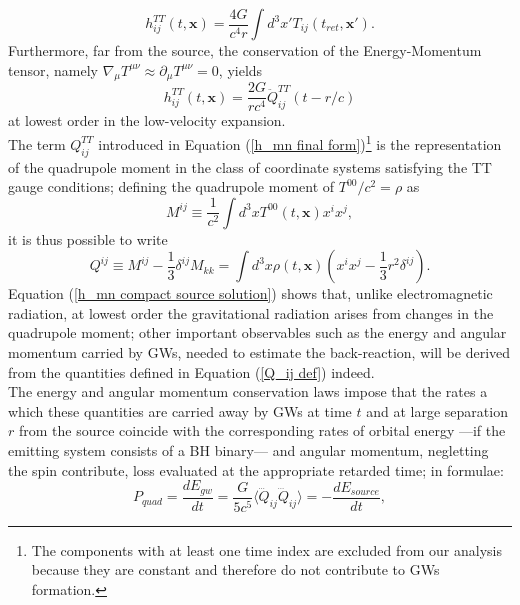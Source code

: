 \begin{equation}\label{h_mn compact source solution}
    h_{ij}^{TT}(t,\mathbf{x})=\frac{4G}{c^4r}\int d^3x'T_{ij}(t_{ret},\mathbf{x'}).
\end{equation}
Furthermore, far from the source, the conservation of the Energy-Momentum tensor, namely $\nabla_\mu T^{\mu\nu}\approx\partial_\mu T^{\mu\nu}=0$, yields
\begin{equation}\label{h_mn final form}
    h_{ij}^{TT}(t,\boldsymbol{x})=\frac{2G}{rc^4}\ddot{Q}^{TT}_{ij}(t-r/c)
\end{equation}
at lowest order in the low-velocity expansion.\\The term $Q^{TT}_{ij}$ introduced in Equation (\ref{h_mn final form})\footnote{The components with at least one time index are excluded from our analysis because they are constant and therefore do not contribute to GWs formation.} is the representation of the quadrupole moment in the class of coordinate systems satisfying the TT gauge conditions; defining the quadrupole moment of $T^{00}/c^2=\rho$ as
\begin{equation}\label{M_ij definition}
    M^{ij}\equiv \frac{1}{c^2}\int d^3x T^{00}(t,\boldsymbol{x})x^ix^j,
\end{equation}
it is thus possible to write
\begin{equation}\label{Q_ij def}
    Q^{ij}\equiv M^{ij}-\frac{1}{3}\delta^{ij}M_{kk}=\int d^3x\rho(t,\mathbf{x})\left(x^ix^j-\frac{1}{3}r^2\delta^{ij}\right).
\end{equation}
Equation (\ref{h_mn compact source solution}) shows that, unlike electromagnetic radiation, at lowest order the gravitational radiation arises from changes in the quadrupole moment; other important observables such as the energy and angular momentum carried by GWs, needed to estimate the back-reaction, will be derived from the quantities defined in Equation (\ref{Q_ij def}) indeed.\\The energy and angular momentum conservation laws impose that the rates a which these quantities are carried away by GWs at time $t$ and at large separation $r$ from the source coincide with the corresponding rates of orbital energy ---if the emitting system consists of a BH binary--- and angular momentum, negletting the spin contribute, loss evaluated at the appropriate retarded time; in formulae:
\begin{equation}\label{energy loss rate by GWs}
    P_{quad}=\frac{dE_{gw}}{dt}=\frac{G}{5c^5}\langle\dddot{Q}_{ij}\dddot{Q}_{ij}\rangle=-\frac{dE_{source}}{dt},
\end{equation}

